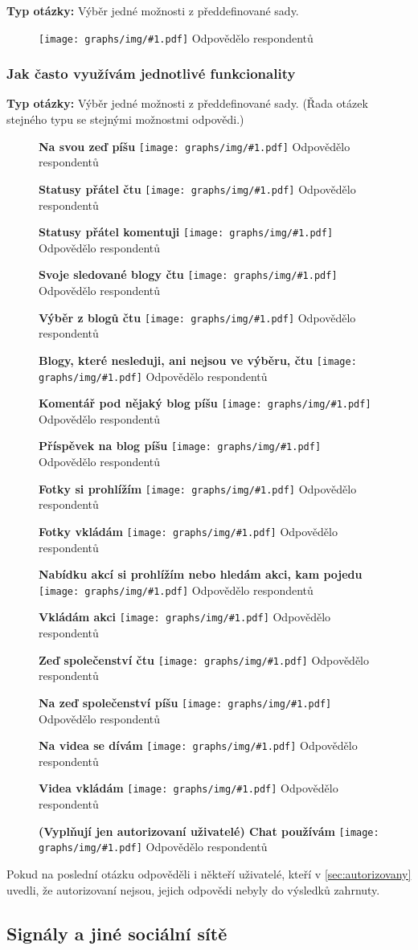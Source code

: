 \documentclass[12pt, a4paper, twoside]{article}
\newcommand{\answercount}[1]{Odpovědělo  respondentů}
\newcommand{\includegraph}[2]{
  \begin{figure}[H]
    \centering
    \textbf{#2}
    \texttt{[image: graphs/img/\#1.pdf]}
    \answercount{#1}
  \end{figure}
}
\newcommand{\qtype}{\textbf{Typ otázky:}
}
\newcommand{\pickOne}{Výběr jedné možnosti z předdefinované sady\xspace}
\newcommand{\series}{(Řada otázek stejného typu se stejnými možnostmi odpovědi.)\xspace}
\begin{document}
\qtype \pickOne.

\includegraph{jsem_autorizovany}{}

\subsubsection{Jak často využívám jednotlivé funkcionality}

\qtype \pickOne. \series

\includegraph{funkcionality_status_pisu}{Na svou zeď píšu}

\includegraph{funkcionality_status_ctu}{Statusy přátel čtu}

\includegraph{funkcionality_status_komentuji}{Statusy přátel komentuji}

\includegraph{funkcionality_sledovane_blogy_ctu}{Svoje sledované blogy čtu}

\includegraph{funkcionality_blogy_vyber_ctu}{Výběr z blogů čtu}

\includegraph{funkcionality_blogy_nesledovane_ctu}{Blogy, které nesleduji, ani nejsou ve výběru, čtu}

\includegraph{funkcionality_blog_komentuji}{Komentář pod nějaký blog píšu}

\includegraph{funkcionality_blog_pisu}{Příspěvek na blog píšu}

\includegraph{funkcionality_fotky_prohlizim}{Fotky si prohlížím}

\includegraph{funkcionality_fotky_vkladam}{Fotky vkládám}

\includegraph{funkcionality_akce_prohlizim}{Nabídku akcí si prohlížím nebo hledám akci, kam pojedu}

\includegraph{funkcionality_akce_vkladam}{Vkládám akci}

\includegraph{funkcionality_zed_spolecenstvi_ctu}{Zeď společenství čtu}

\includegraph{funkcionality_zed_spolecenstvi_pisu}{Na zeď společenství píšu}

\includegraph{funkcionality_videa_prohlizim}{Na videa se dívám}

\includegraph{funkcionality_videa_vkladam}{Videa vkládám}

\includegraph{funkcionality_autorizovani_chat}{(Vyplňují jen autorizovaní uživatelé) Chat používám}

Pokud na poslední otázku odpověděli i někteří uživatelé,
kteří v \ref{sec:autorizovany} uvedli, že autorizovaní nejsou,
jejich odpovědi nebyly do výsledků zahrnuty.

\subsection{Signály a jiné sociální sítě}\label{sec:jinesite}
\end{document}
